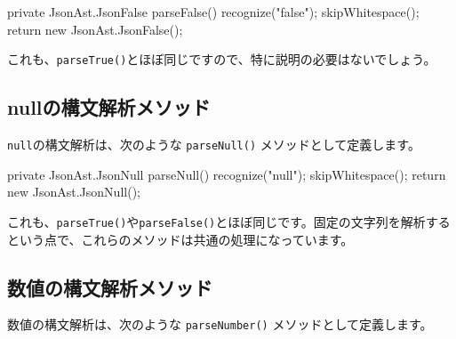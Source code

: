 \begin{codescreen}{}
private JsonAst.JsonFalse parseFalse() {
    recognize("false");
    skipWhitespace();
    return new JsonAst.JsonFalse();
}
\end{codescreen}

これも、\texttt{parseTrue()}とほぼ同じですので、特に説明の必要はないでしょう。

\subsection{nullの構文解析メソッド}

\texttt{null}の構文解析は、次のような \texttt{parseNull()}
メソッドとして定義します。

\begin{codescreen}{}
private JsonAst.JsonNull parseNull() {
    recognize("null");
    skipWhitespace();
    return new JsonAst.JsonNull();
}
\end{codescreen}

これも、\texttt{parseTrue()}や\texttt{parseFalse()}とほぼ同じです。固定の文字列を解析するという点で、これらのメソッドは共通の処理になっています。

\subsection{数値の構文解析メソッド}

数値の構文解析は、次のような \texttt{parseNumber()}
メソッドとして定義します。

